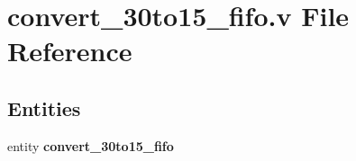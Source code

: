\section{convert\-\_\-30to15\-\_\-fifo.\-v File Reference}
\label{convert__30to15__fifo_8v}
\subsection*{Entities}
\begin{DoxyCompactItemize}
\item 
entity {\bf convert\-\_\-30to15\-\_\-fifo}
\end{DoxyCompactItemize}
